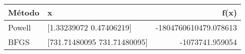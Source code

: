 \begin{tabular}{llr}
\toprule
Método & x & f(x) \\
\midrule
Powell & [1.33239072 0.47406219] & -1804760610479.078613 \\
BFGS & [731.71480095 731.71480095] & -1073741.959054 \\
\bottomrule
\end{tabular}
